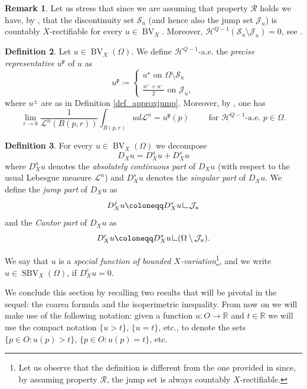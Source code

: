 \documentclass[12pt,a4paper]{amsart}
\theoremstyle{definition}
\newtheorem{defi}{Definition}[section]
\newtheorem{rem}[defi]{Remark}
\theoremstyle{plain}
\newcommand{\R}{\mathbb{R}}
\newcommand{\ceq}{\coloneqq}
\newcommand{\res} {\mathop{\hbox{\vrule height 7pt width .5pt depth 0pt \vrule height .5pt width 6pt depth 0pt}}\nolimits}
\newcommand{\leb}{\mathcal{L}}
\newcommand{\sbv}{\operatorname{SBV}}
\newcommand{\bv}{\operatorname{BV}}
\newcommand{\J}{\mathcal{J}}
\newcommand{\hau}{\mathcal{H}}
\newcommand{\s}{\mathcal{S}}
\newcommand{\p}{{\mathfrak{p}}}
\begin{document}
\begin{rem}\label{rem_proprietaR}
Let us stress that since we are assuming that property $\mathcal{R}$ holds we have, by \cite[Theorem 1.5]{dv}, that the discontinuity set $\s_u$ (and hence also the jump set $\J_u$) is countably $X$-rectifiable for every $u \in \bv_X$. Moreover, $\hau^{Q-1}(\s_u \setminus \J_u)=0$, see \cite[Theorem 1.5]{dv}.
\end{rem}


\begin{defi}
    Let $u \in \bv_X(\Omega)$. We define $\hau^{Q-1}$-a.e. the \emph{precise representative} $u^\p$ of $u$ as
    \[
    u^\p \ceq \begin{cases}
        u^\star \text{ on } \Omega \setminus \s_u\\
       \displaystyle \frac{u^++u^-}{2} \text{ on } \J_u,        
    \end{cases}
    \]
    where $u^\pm$ are as in Definition \ref{def_approxjump}. Moreover, by \cite[Theorem 3.14]{dv}, one has 
   \[
 \lim_{r \to 0} \frac{1}{\leb^n(B(p,r))}  \int_{B(p,r)} u d\leb^n = u^\p(p) \qquad \text{ for $\hau^{Q-1}$-a.e. $p \in \Omega$}.
   \]
    \end{defi}
\begin{defi} 
For every $u \in \bv_X(\Omega)$ we decompose
\[
D_Xu=D_X^au+D_X^su
\]
where $D_X^au$ denotes the \emph{absolutely continuous part} of $D_Xu$ (with respect to the usual Lebesgue measure $\leb^n$) and $D_X^su$ denotes the \emph{singular part} of $D_Xu$. We define the \emph{jump part} of $D_Xu$ as 
\[
D_X^ju \ceq D_X^s u \res \J_u
\]
and the \emph{Cantor part} of $D_Xu$ as
\[
D_X^cu \ceq D_X^s u \res (\Omega \setminus \J_u).
\]

 We say that $u$ is a \emph{special function of bounded $X$-variation}\footnote{Let us observe that the definition is different from the one provided in \cite{sbvx} since, by assuming property $\mathcal{R}$, the jump set is always countably $X$-rectifiable.}, and we write $u \in \sbv_X(\Omega)$, if $D_X^cu=0$.
\end{defi}












We conclude this section by recalling two results that will be pivotal in the sequel: the coarea formula and the isoperimetric inequality. From now on we will make use of the following notation: given a function $u:O \to \R$ and $t \in \R$ we will use the compact notation $\{u>t\}$, $\{u=t\}$, etc., to denote the sets $\{p \in O:u(p)>t\}$, $\{p \in O:u(p)=t\}$, etc.
\end{document}
